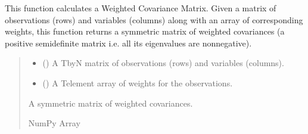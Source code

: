 \documentclass[letterpaper,10pt,english]{sphinxmanual}
\begin{document}

\begin{fulllineitems}
\label{\detokenize{modules/quantum/particle_filter:qnav.quantum.particle_filter.weighted_cov}}
\pysigstartsignatures
{}
\pysigstopsignatures
\sphinxAtStartPar
This function calculates a Weighted Covariance Matrix.
Given a matrix of observations (rows) and variables (columns) along with
an array of corresponding weights, this function returns a symmetric
matrix of weighted covariances (a positive semi\sphinxhyphen{}definite matrix i.e. all
its eigenvalues are non\sphinxhyphen{}negative).
\begin{quote}\begin{description}
\begin{itemize}
\item {} 
\sphinxAtStartPar
{} (\sphinxstyleliteralemphasis{\sphinxupquote{ (}}\sphinxstyleliteralemphasis{\sphinxupquote{)}}) \textendash{} A T\sphinxhyphen{}by\sphinxhyphen{}N matrix of observations (rows) and variables (columns).

\item {} 
\sphinxAtStartPar
{} (\sphinxstyleliteralemphasis{\sphinxupquote{ (}}\sphinxstyleliteralemphasis{\sphinxupquote{)}}) \textendash{} A T\sphinxhyphen{}element array of weights for the observations.

\end{itemize}

\sphinxAtStartPar
A symmetric matrix of weighted covariances.

\sphinxAtStartPar
NumPy Array

\end{description}\end{quote}

\end{fulllineitems}
\end{document}
